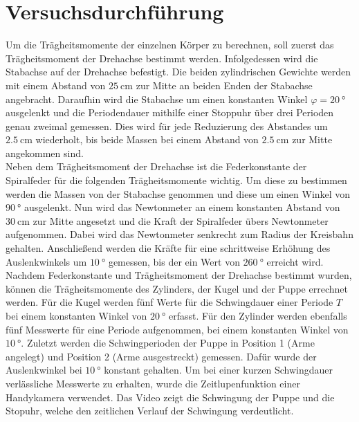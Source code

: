 \section{Versuchsdurchführung}\justifying

Um die Trägheitsmomente der einzelnen Körper zu berechnen, soll zuerst das Trägheitsmoment der Drehachse bestimmt werden. Infolgedessen wird die
Stabachse auf der Drehachse befestigt. Die beiden zylindrischen Gewichte werden mit einem Abstand von $\SI{25}{\centi\meter}$ zur Mitte an beiden 
Enden der Stabachse angebracht. Daraufhin wird die Stabachse um einen konstanten Winkel $\varphi = \SI{20}{\degree}$ ausgelenkt und die Periodendauer mithilfe
einer Stoppuhr über drei Perioden genau zweimal gemessen. Dies wird für jede Reduzierung des Abstandes um $\SI{2.5}{\centi\meter}$ wiederholt, bis beide 
Massen bei einem Abstand von $\SI{2.5}{\centi\meter}$ zur Mitte angekommen sind.\\
Neben dem Trägheitsmoment der Drehachse ist die Federkonstante der Spiralfeder für die folgenden Trägheitsmomente wichtig. Um diese zu bestimmen 
werden die Massen von der Stabachse genommen und diese um einen Winkel von $\SI{90}{\degree}$  ausgelenkt. Nun wird das Newtonmeter an einem konstanten Abstand von 
$\SI{30}{\centi\meter}$ zur Mitte angesetzt und die Kraft der Spiralfeder übers Newtonmeter aufgenommen. Dabei wird das Newtonmeter
senkrecht zum Radius der Kreisbahn gehalten. Anschließend werden die Kräfte für eine schrittweise Erhöhung des Auslenkwinkels um $\SI{10}{\degree}$ gemessen,
bis der ein Wert von $\SI{260}{\degree}$ erreicht wird.\\
Nachdem Federkonstante und Trägheitsmoment der Drehachse bestimmt wurden, können die Trägheitsmomente des Zylinders, der Kugel und der Puppe
errechnet werden. Für die Kugel werden fünf Werte für die Schwingdauer einer Periode $T$ bei einem konstanten Winkel von $\SI{20}{\degree}$ erfasst.
Für den Zylinder werden ebenfalls fünf Messwerte für eine Periode aufgenommen, bei einem konstanten Winkel von $\SI{10}{\degree}$. 
Zuletzt werden die Schwingperioden der Puppe in Position 1 (Arme angelegt) und Position 2 (Arme ausgestreckt) gemessen. Dafür wurde der Auslenkwinkel
bei $\SI{10}{\degree}$ konstant gehalten. Um bei einer kurzen Schwingdauer verlässliche Messwerte zu erhalten, wurde die Zeitlupenfunktion einer 
Handykamera verwendet. Das Video zeigt die Schwingung der Puppe und die Stopuhr, welche den zeitlichen Verlauf der Schwingung verdeutlicht.\\

